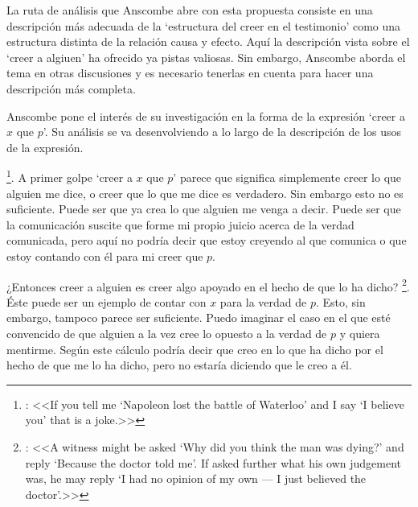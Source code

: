 La ruta de análisis que Anscombe abre con esta propuesta consiste en una descripción más adecuada de la `estructura del creer en el testimonio' como una estructura distinta de la relación causa y efecto. Aquí la descripción vista sobre el `creer a algiuen' ha ofrecido ya pistas valiosas. Sin embargo, Anscombe aborda el tema en otras discusiones y es necesario tenerlas en cuenta para hacer una descripción más completa.

Anscombe pone el interés de su investigación en la forma de la expresión `creer a $x$ que $p$'\autocite[Cf.~][2]{anscombe2008faith:tobelieve}. Su análisis se va desenvolviendo a lo largo de la descripción de los usos de la expresión.

\footnote{\cite[4]{anscombe2008faith:tobelieve}: <<If you tell me `Napoleon lost the battle of Waterloo' and I say `I believe you' that is a joke.>>}. A primer golpe `creer a $x$ que $p$' parece que significa simplemente creer lo que alguien me dice, o creer que lo que me dice es verdadero. Sin embargo esto no es suficiente. Puede ser que ya crea lo que alguien me venga a decir. Puede ser que la comunicación suscite que forme mi propio juicio acerca de la verdad comunicada, pero aquí no podría decir que estoy creyendo al que comunica o que estoy contando con él para mi creer que $p$.

¿Entonces creer a alguien es creer algo apoyado en el hecho de que lo ha dicho? \footnote{\cite[4]{anscombe2008faith:tobelieve}: <<A witness might be asked `Why did you think the man was dying?' and reply `Because the doctor told me'. If asked further what his own judgement was, he may reply `I had no opinion of my own --- I just believed the doctor'.>>}. Éste puede ser un ejemplo de contar con $x$ para la verdad de $p$. Esto, sin embargo, tampoco parece ser suficiente. Puedo imaginar el caso en el que esté convencido de que alguien a la vez cree lo opuesto a la verdad de $p$ y quiera mentirme. Según este cálculo podría decir que creo en lo que ha dicho por el hecho de que me lo ha dicho, pero no estaría diciendo que le creo a él.

